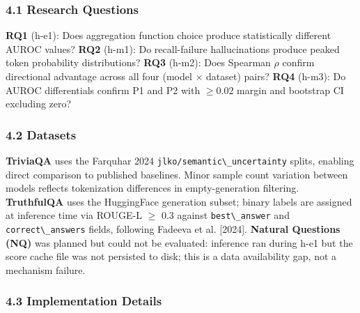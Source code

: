 
\subsubsection{4.1 Research Questions}

\textbf{RQ1} (h-e1): Does aggregation function choice produce statistically different AUROC values?  
\textbf{RQ2} (h-m1): Do recall-failure hallucinations produce peaked token probability distributions?  
\textbf{RQ3} (h-m2): Does Spearman $\rho$ confirm directional advantage across all four (model $\times$ dataset) pairs?  
\textbf{RQ4} (h-m3): Do AUROC differentials confirm P1 and P2 with $\geq 0.02$ margin and bootstrap CI excluding zero?

\subsubsection{4.2 Datasets}

\begin{table}[htbp]
\centering
{}
\end{table}

\textbf{TriviaQA} \citep{Joshi2017TriviaQA} uses the Farquhar 2024 \texttt{jlko/semantic\textbackslash \_uncertainty} splits, enabling direct comparison to published baselines. Minor sample count variation between models reflects tokenization differences in empty-generation filtering. \textbf{TruthfulQA} \citep{Lin2021TruthfulQA} uses the HuggingFace generation subset; binary labels are assigned at inference time via ROUGE-L $\geq$ 0.3 against \texttt{best\textbackslash \_answer} and \texttt{correct\textbackslash \_answers} fields, following Fadeeva et al. [2024]. \textbf{Natural Questions (NQ)} was planned but could not be evaluated: inference ran during h-e1 but the score cache file was not persisted to disk; this is a data availability gap, not a mechanism failure.

\subsubsection{4.3 Implementation Details}

